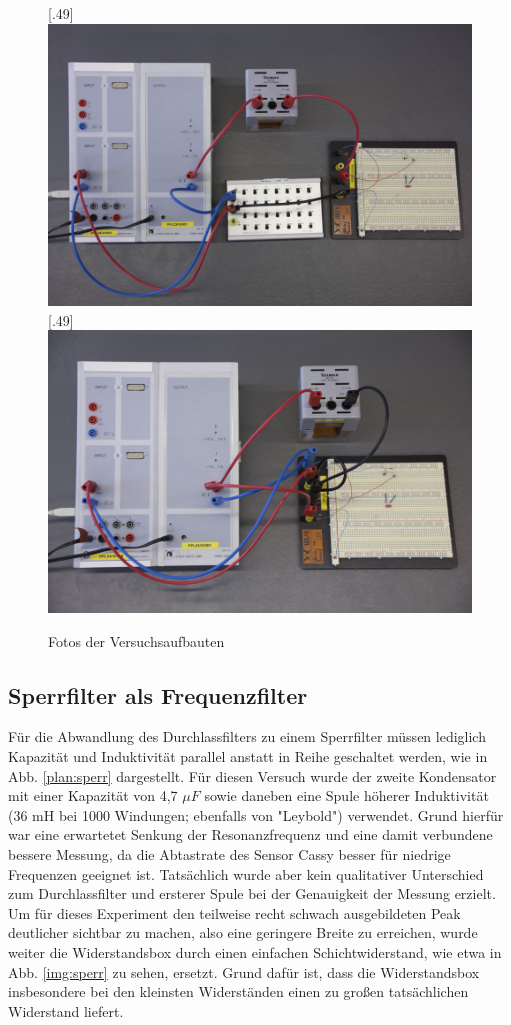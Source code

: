 \begin{figure}[h]
\centering
    [.49\linewidth]
            {\includegraphics[width=.495\textwidth]{images/durchlassfilter.jpg}}
    [.49\linewidth]
            {\includegraphics[width=.495\textwidth]{images/sperrfilter.jpg}}
\caption{Fotos der Versuchsaufbauten}
\end{figure}

\subsection{Sperrfilter als Frequenzfilter}
Für die Abwandlung des Durchlassfilters zu einem Sperrfilter müssen lediglich Kapazität und Induktivität parallel anstatt in Reihe geschaltet werden, wie in Abb. \ref{plan:sperr} dargestellt. Für diesen Versuch wurde der zweite Kondensator mit einer Kapazität von 4,7 $  \mu F $ sowie daneben eine Spule höherer Induktivität (36 mH bei 1000 Windungen; ebenfalls von "Leybold") verwendet. Grund hierfür war eine erwartetet Senkung der Resonanzfrequenz und eine damit verbundene bessere Messung, da die Abtastrate des Sensor Cassy besser für niedrige Frequenzen geeignet ist. Tatsächlich wurde aber kein qualitativer Unterschied zum Durchlassfilter und ersterer Spule 
bei der Genauigkeit der Messung erzielt. Um für dieses Experiment den teilweise recht schwach ausgebildeten Peak deutlicher sichtbar zu machen, also eine geringere Breite zu erreichen, wurde weiter die Widerstandsbox durch einen einfachen Schichtwiderstand, wie etwa in Abb. \ref{img:sperr} zu sehen,
ersetzt. Grund dafür ist, dass die Widerstandsbox insbesondere bei den kleinsten Widerständen einen zu großen tatsächlichen Widerstand liefert.



